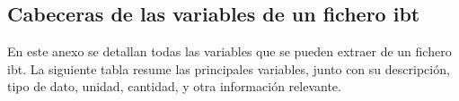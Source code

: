 \begin{landscape}
\chapter{Cabeceras de las variables de un fichero \ac{ibt}}
\label{cap:AnexoA}
En este anexo se detallan todas las variables que se pueden extraer de un fichero \ac{ibt}. La siguiente tabla resume las principales variables, junto con su descripción, tipo de dato, unidad, cantidad, y otra información relevante.

%
\end{landscape}